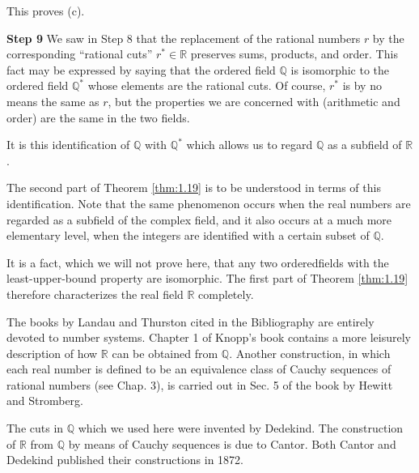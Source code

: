 This proves (c).

\textbf{Step 9} We saw in Step 8 that the replacement of the rational numbers $r$ by the corresponding ``rational cuts'' $r^* \in \mathbb{R}$ preserves sums, products, and order. This fact may be expressed by saying that the ordered field $\mathbb{Q}$ is isomorphic to the ordered field $\mathbb{Q}^*$ whose elements are the rational cuts. Of course, $r^*$ is by no means the same as $r$, but the properties we are concerned with (arithmetic and order) are the same in the two fields.

It is this identification of $\mathbb{Q}$ with $\mathbb{Q}^*$ which allows us to regard $\mathbb{Q}$ as a subfield of $\mathbb{R}$.

The second part of Theorem \ref{thm:1.19} is to be understood in terms of this identification. Note that the same phenomenon occurs when the real numbers are regarded as a subfield of the complex field, and it also occurs at a much more elementary level, when the integers are identified with a certain subset of $\mathbb{Q}$.

It is a fact, which we will not prove here, that any two orderedfields with the least-upper-bound property are isomorphic. The first part of Theorem \ref{thm:1.19} therefore characterizes the real field $\mathbb{R}$ completely.

The books by Landau and Thurston cited in the Bibliography are entirely devoted to number systems. Chapter 1 of Knopp's book contains a more leisurely description of how $\mathbb{R}$ can be obtained from $\mathbb{Q}$. Another construction, in which each real number is defined to be an equivalence class of Cauchy sequences of rational numbers (see Chap. 3), is carried out in Sec. 5 of the book by Hewitt and Stromberg.

The cuts in $\mathbb{Q}$ which we used here were invented by Dedekind. The construction of $\mathbb{R}$ from $\mathbb{Q}$ by means of Cauchy sequences is due to Cantor. Both Cantor and Dedekind published their constructions in 1872.
